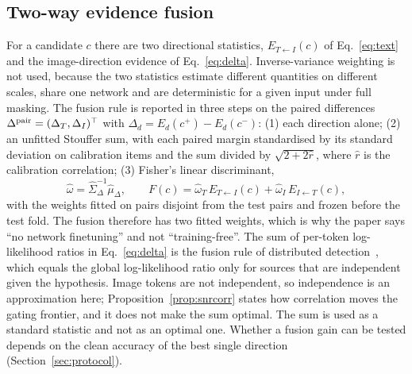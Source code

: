 \subsection{Two-way evidence fusion}\label{ssec:fusion}
For a candidate $c$ there are two directional statistics, $E_{T\leftarrow I}(c)$ of Eq.~\eqref{eq:text} and the image-direction
evidence of Eq.~\eqref{eq:delta}.
Inverse-variance weighting is not used, because the two statistics estimate different quantities on different scales, share
one network and are deterministic for a given input under full masking.
The fusion rule is reported in three steps on the paired differences $\Delta^{\rm pair}=(\Delta_T,\Delta_I)^\top$ with
$\Delta_d=E_d(c^+)-E_d(c^-)$:
(1) each direction alone;
(2) an unfitted Stouffer sum, with each paired margin standardised by its standard deviation on calibration items and the sum
divided by $\sqrt{2+2\hat r}$, where $\hat r$ is the calibration correlation;
(3) Fisher's linear discriminant,
\begin{equation}
\hat\omega=\hat\Sigma_{\Delta}^{-1}\hat\mu_{\Delta},\qquad F(c)=\hat\omega_T\,E_{T\leftarrow I}(c)+\hat\omega_I\,E_{I\leftarrow T}(c),
\label{eq:lda}
\end{equation}
with the weights fitted on pairs disjoint from the test pairs and frozen before the test fold.
The fusion therefore has two fitted weights, which is why the paper says ``no network finetuning'' and not ``training-free''.
The sum of per-token log-likelihood ratios in Eq.~\eqref{eq:delta} is the fusion rule of distributed detection~\cite{chair1986optimal}, which
equals the global log-likelihood ratio only for sources that are independent given the hypothesis.
Image tokens are not independent, so independence is an approximation here; Proposition~\ref{prop:snrcorr} states how correlation
moves the gating frontier, and it does not make the sum optimal.
The sum is used as a standard statistic and not as an optimal one.
Whether a fusion gain can be tested depends on the clean accuracy of the best single direction (Section~\ref{sec:protocol}).

